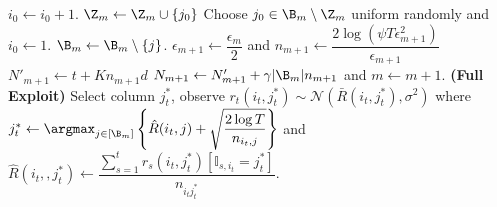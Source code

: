 \begin{algorithm}[!th]
\begin{algorithmic}[1]
\State $i_0 \leftarrow i_0 + 1$.
\Else
\State $\Z_m \leftarrow \Z_m \cup \lbrace j_0\rbrace$
\State Choose $j_0\in\B_m\setminus \Z_m$ uniform randomly and $i_0 \leftarrow 1$.
\EndIf
\Else
\ColElim
\State {}
\State {}
\State $\B_m \leftarrow \B_m \setminus \lbrace j \rbrace$. 
\EndWhile
\EndFor
\EndColElim
\ResParam
\State $\epsilon_{m+1} \leftarrow \dfrac{\epsilon_m}{2}$ and $n_{m+1} \leftarrow \dfrac{2\log(\psi T\epsilon_{m+1}^2)}{\epsilon_{m+1}}$
\State $N'_{m+1}\leftarrow t + K n_{m+1} d$
\State $N_{m+1} \leftarrow N'_{m+1} + \gamma |\B_m|n_{m+1}$ and $m \leftarrow m + 1$.
\EndResParam
\EndIf
\Else \textbf{ (Full Exploit) }
\State  Select column $j_t^*$, observe $r_t(i_t,j_t^*)\sim \mathcal{N}(\bar{R}(i_t,j_t^*),\sigma^2)$ where $j_t^* \leftarrow \argmax_{j\in[\B_m]} \left\lbrace \hat{R}(i_t,j) + \sqrt{\dfrac{2\log T}{n_{i_t,j}}}\right\rbrace$ and $\hat{R}(i_t,,j_t^*)\leftarrow \dfrac{\sum_{s=1}^{t}r_s(i_t,j_t^*)[\mathbb{I}_{s,i_t} = j_t^*]}{n_{i_tj_t^*}}$.
\EndIf
\EndFor
\end{algorithmic}
\end{algorithm}


